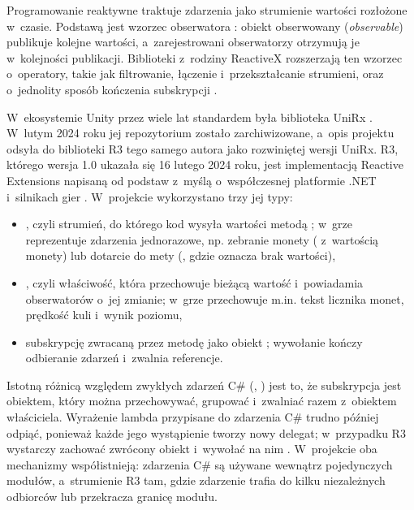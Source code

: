 Programowanie reaktywne traktuje zdarzenia jako strumienie wartości rozłożone w~czasie.
Podstawą jest wzorzec obserwatora \cite{gof}: obiekt obserwowany (\emph{observable})
publikuje kolejne wartości, a~zarejestrowani obserwatorzy otrzymują je w~kolejności
publikacji. Biblioteki z~rodziny ReactiveX rozszerzają ten wzorzec o~operatory, takie jak
filtrowanie, łączenie i~przekształcanie strumieni, oraz o~jednolity sposób kończenia
subskrypcji \cite{reactivex}.

W~ekosystemie Unity przez wiele lat standardem była biblioteka UniRx \cite{unirx}.
W~lutym 2024 roku jej repozytorium zostało zarchiwizowane, a~opis projektu odsyła do
biblioteki R3 tego samego autora jako rozwiniętej wersji UniRx. R3, którego wersja 1.0
ukazała się 16 lutego 2024 roku, jest implementacją Reactive Extensions napisaną od
podstaw z~myślą o~współczesnej platformie .NET i~silnikach gier \cite{r3}. W~projekcie
wykorzystano trzy jej typy:
\begin{itemize}[leftmargin=1.9cm, itemsep=1pt]
  \item {}, czyli strumień, do którego kod wysyła wartości metodą
        ; w~grze reprezentuje zdarzenia jednorazowe, np. zebranie monety
        ( z~wartością monety) lub dotarcie do mety
        (, gdzie  oznacza brak wartości),
  \item {}, czyli właściwość, która przechowuje bieżącą wartość
        i~powiadamia obserwatorów o~jej zmianie; w~grze przechowuje m.in. tekst licznika
        monet, prędkość kuli i~wynik poziomu,
  \item subskrypcję zwracaną przez metodę  jako obiekt ;
        wywołanie  kończy odbieranie zdarzeń i~zwalnia referencje.
\end{itemize}

Istotną różnicą względem zwykłych zdarzeń C\# (, ) jest to, że
subskrypcja jest obiektem, który można przechowywać, grupować i~zwalniać razem z~obiektem
właściciela. Wyrażenie lambda przypisane do zdarzenia C\# trudno później odpiąć, ponieważ
każde jego wystąpienie tworzy nowy delegat; w~przypadku R3 wystarczy zachować zwrócony
obiekt i~wywołać na nim . W~projekcie oba mechanizmy współistnieją: zdarzenia
C\# są używane wewnątrz pojedynczych modułów, a~strumienie R3 tam, gdzie zdarzenie trafia
do kilku niezależnych odbiorców lub przekracza granicę modułu.

